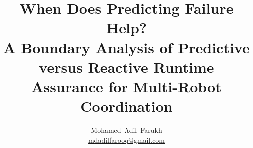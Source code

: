 \documentclass[11pt,a4paper]{article}
\begin{document}
\title{When Does Predicting Failure Help?\\[0.4em]
  \large A Boundary Analysis of Predictive versus Reactive Runtime Assurance
  for Multi-Robot Coordination}

\author{Mohamed~Adil~Farukh\\[0.3em]
  \small\href{mailto:mdadilfarooq@gmail.com}{mdadilfarooq@gmail.com}}
\date{}

\maketitle













\end{document}
